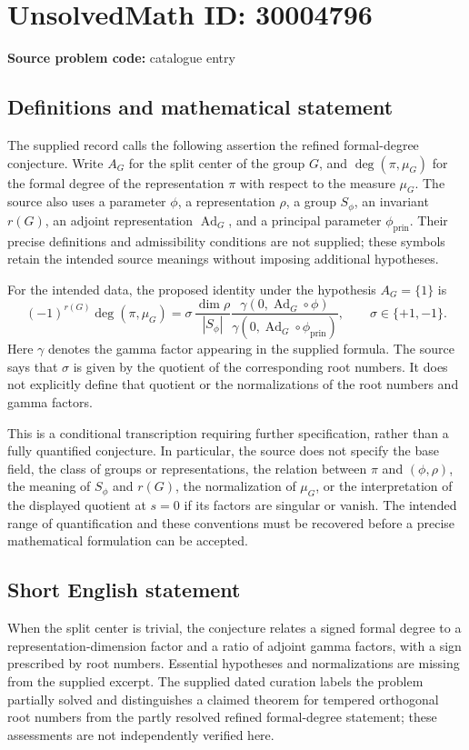 \documentclass[11pt]{article}
\begin{document}
\section*{UnsolvedMath ID: 30004796}
\textbf{Source problem code:} catalogue entry
\subsection{Definitions and mathematical statement}
The supplied record calls the following assertion the refined formal-degree conjecture. Write \(A_G\) for the split center of the group \(G\), and \(\deg(\pi,\mu_G)\) for the formal degree of the representation \(\pi\) with respect to the measure \(\mu_G\). The source also uses a parameter \(\phi\), a representation \(\rho\), a group \(S_\phi\), an invariant \(r(G)\), an adjoint representation \(\operatorname{Ad}_G\), and a principal parameter \(\phi_{\operatorname{prin}}\). Their precise definitions and admissibility conditions are not supplied; these symbols retain the intended source meanings without imposing additional hypotheses.

For the intended data, the proposed identity under the hypothesis \(A_G=\{1\}\) is
\[
(-1)^{r(G)}\deg(\pi,\mu_G)
=
\sigma\,\frac{\dim\rho}{|S_\phi|}
\frac{\gamma\!\left(0,\operatorname{Ad}_G\circ\phi\right)}
{\gamma\!\left(0,\operatorname{Ad}_G\circ\phi_{\operatorname{prin}}\right)},
\qquad \sigma\in\{+1,-1\}.
\]
Here \(\gamma\) denotes the gamma factor appearing in the supplied formula. The source says that \(\sigma\) is given by the quotient of the corresponding root numbers. It does not explicitly define that quotient or the normalizations of the root numbers and gamma factors.

This is a conditional transcription requiring further specification, rather than a fully quantified conjecture. In particular, the source does not specify the base field, the class of groups or representations, the relation between \(\pi\) and \((\phi,\rho)\), the meaning of \(S_\phi\) and \(r(G)\), the normalization of \(\mu_G\), or the interpretation of the displayed quotient at \(s=0\) if its factors are singular or vanish. The intended range of quantification and these conventions must be recovered before a precise mathematical formulation can be accepted.
\subsection{Short English statement}
When the split center is trivial, the conjecture relates a signed formal degree to a representation-dimension factor and a ratio of adjoint gamma factors, with a sign prescribed by root numbers. Essential hypotheses and normalizations are missing from the supplied excerpt. The supplied dated curation labels the problem partially solved and distinguishes a claimed theorem for tempered orthogonal root numbers from the partly resolved refined formal-degree statement; these assessments are not independently verified here.
\end{document}
